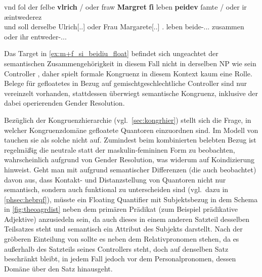 \begin{exe}
\ex \label{ex:m+f_si_beidiu_float}
	\gll vnd ſol {der ſelbe} \textbf{vlrich} / oder fraw \textbf{Margret} \textelp{}
			\textbf{ſi} leben \textbf{peidev} ſamte / oder ir æintwederez \\
		und soll derselbe Ulrich[\Nom.\Sg.\MascM] {} oder Frau
			Margarete[\Nom.\Sg.\FemF] {} \Tpl\subMF.\Nom{} leben
			beide-\Nom.\Pl.\NeutMF.\St{} zusammen {} oder ihr
			entweder-\Nom.\Sg.\NeutMF.\St{} \\
	\begin{taggedline}{\parencites(Brixen, 1298)[\pno~3141~A, 352.3--9]{cao4}}
	\trans {}
	\end{taggedline}
\end{exe}

Das Target  in \cref{ex:m+f_si_beidiu_float} befindet sich
ungeachtet der semantischen Zusammengehörigkeit in diesem Fall nicht in
derselben NP wie sein Controller  , daher spielt formale Kongruenz in diesem Kontext kaum
eine Rolle. Belege für gefloatetes  in Bezug auf
gemischtgeschlechtliche Controller sind nur vereinzelt vorhanden, stattdessen
überwiegt semantische Kongruenz, inklusive der dabei operierenden Gender
Resolution.

Bezüglich der Kongruenzhierarchie (vgl.~\cref{sec:kongrhier}) stellt sich die
Frage, in welcher Kongruenzdomäne gefloatete Quantoren einzuordnen sind. Im
Modell von \textcites{corbett1979}[84]{wechslerzlatic2003} tauchen sie als
solche nicht auf. Zumindest beim kombinierten belebten Bezug ist regelmäßig die
neutrale statt der maskulin-femininen Form zu beobachten, wahrscheinlich
aufgrund von Gender Resolution, was widerum auf Koindizierung hinweist. Geht
man mit \citet{spector2009} aufgrund semantischer Differenzen (die auch
\cite{pittner1995} beobachtet) davon aus, dass Kontakt- und Distanzstellung von
Quantoren nicht nur semantisch, sondern auch funktional zu unterscheiden sind
(vgl.~dazu in \cref{phsec:hebrqf}), müsste ein Floating Quantifier mit
Subjektsbezug in dem Schema in \cref{fig:theoagrdist} neben dem primären
Prädikat (zum Beispiel prädikative Adjektive) anzusiedeln sein, da auch dieses
in einem anderen Satzteil desselben Teilsatzes steht und semantisch ein
Attribut des Subjekts darstellt. Nach der gröberen Einteilung von
\citet[216]{corbett1979} sollte es neben dem Relativpronomen stehen, da es
außerhalb des Satzteils seines Controllers steht, doch auf denselben Satz
beschränkt bleibt, in jedem Fall jedoch vor dem Personalpronomen, dessen Domäne
über den Satz hinausgeht.%

